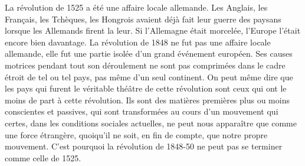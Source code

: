 \documentclass[french,twoside]{book} %
\newif\ifdev
\renewcommand{\LettrineFontHook}{\color{rubric}}
\newcommand{\initialiv}[2]{%
  \let\oldLFH\LettrineFontHook
  \IfSubStr{QJ’}{#1}{
    \lettrine[lines=4, lhang=0.2, loversize=-0.1, lraise=0.2]{\smash{#1}}{#2}
  }{\IfSubStr{É}{#1}{
    \lettrine[lines=4, lhang=0.2, loversize=-0, lraise=0]{\smash{#1}}{#2}
  }{\IfSubStr{ÀÂ}{#1}{
    \lettrine[lines=4, lhang=0.2, loversize=-0, lraise=0, slope=0.6em]{\smash{#1}}{#2}
  }{\IfSubStr{A}{#1}{
    \lettrine[lines=4, lhang=0.2, loversize=0.2, slope=0.6em]{\smash{#1}}{#2}
  }{\IfSubStr{V}{#1}{
    \lettrine[lines=4, lhang=0.2, loversize=0.2, slope=-0.5em]{\smash{#1}}{#2}
  }{
    \lettrine[lines=4, lhang=0.2, loversize=0.2]{\smash{#1}}{#2}
  }}}}}
  \let\LettrineFontHook\oldLFH
}
\newcommand\chapterclose{} %
\renewcommand{\LettrineFontHook}{\bfseries\color{rubric}}
\begin{document}
La révolution de 1525 a été une affaire locale allemande. Les Anglais, les Français, les Tchèques, les Hongrois avaient déjà fait leur guerre des paysans lorsque les Allemands firent la leur. Si l’Allemagne était morcelée, l’Europe l’était encore bien davantage. La révolution de 1848 ne fut pas une affaire locale allemande, elle fut une partie isolée d’un grand événement européen. Ses causes motrices pendant tout son déroulement ne sont pas comprimées dans le cadre étroit de tel ou tel pays, pas même d’un seul continent. On peut même dire que les pays qui furent le véritable théâtre de cette révolution sont ceux qui ont le moins de part à cette révolution. Ils sont des matières premières plus ou moins conscientes et passives, qui sont transformées au cours d’un mouvement qui certes, dans les conditions sociales actuelles, ne peut nous apparaître que comme une force étrangère, quoiqu’il ne soit, en fin de compte, que notre propre mouvement. C’est pourquoi la révolution de 1848-50 ne peut pas se terminer comme celle de 1525.
\chapterclose

 


\ifbooklet
  \newpage\null\thispagestyle{empty}\newpage
\fi

\ifdev %
\fontname\font — \textsc{Les règles du jeu}\par
(\hyperref[utopie]{\underline{Lien}})\par
\noindent \initialiv{A}{lors là}\blindtext\par
\noindent \initialiv{À}{ la bonheur des dames}\blindtext\par
\noindent \initialiv{É}{tonnez-le}\blindtext\par
\noindent \initialiv{Q}{ualitativement}\blindtext\par
\noindent \initialiv{V}{aloriser}\blindtext\par
\Blindtext
\phantomsection
\label{utopie}
\Blinddocument
\fi
\end{document}
